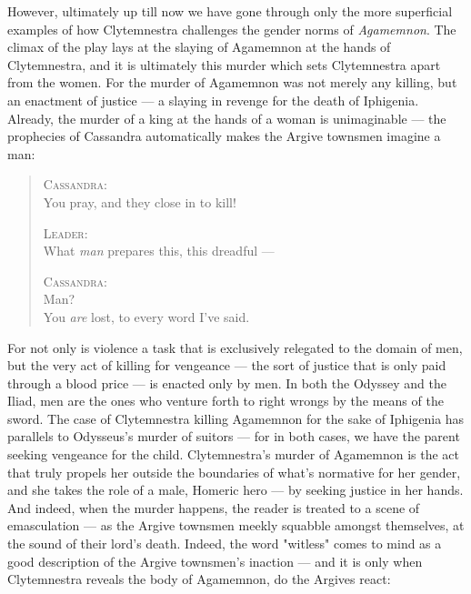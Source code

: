 However, ultimately up till now we have gone through only the more superficial
examples of how Clytemnestra challenges the gender norms of \emph{Agamemnon}.
The climax of the play lays at the slaying of Agamemnon at the hands of
Clytemnestra, and it is ultimately this murder which sets Clytemnestra apart
from the women. For the murder of Agamemnon was not merely any killing, but an
enactment of justice --- a slaying in revenge for the death of Iphigenia.
Already, the murder of a king at the hands of a woman is unimaginable --- the
prophecies of Cassandra automatically makes the Argive townsmen imagine a man:

\begin{quote}
  \textsc{Cassandra}: \\
  You pray, and they close in to kill!

  \textsc{Leader}: \\
  What \emph{man} prepares this, this dreadful ---

  \textsc{Cassandra}: \\
  Man? \\
  You \emph{are} lost, to every word I've said.

  \autocite[1262]{fagles}
\end{quote}

\noindent
For not only is violence a task that is exclusively relegated to the domain of
men, but the very act of killing for vengeance --- the sort of justice that is
only paid through a blood price --- is enacted only by men. In both the Odyssey
and the Iliad, men are the ones who venture forth to right wrongs by the means
of the sword. The case of Clytemnestra killing Agamemnon for the sake of
Iphigenia has parallels to Odysseus's murder of suitors --- for in both cases,
we have the parent seeking vengeance for the child. Clytemnestra's murder of
Agamemnon is the act that truly propels her outside the boundaries of what's
normative for her gender, and she takes the role of a male, Homeric hero --- by
seeking justice in her hands. And indeed, when the murder happens, the reader
is treated to a scene of emasculation --- as the Argive townsmen meekly squabble
amongst themselves, at the sound of their lord's death. Indeed, the word
"witless" comes to mind as a good description of the Argive townsmen's inaction
--- and it is only when Clytemnestra reveals the body of Agamemnon, do the
Argives react:

